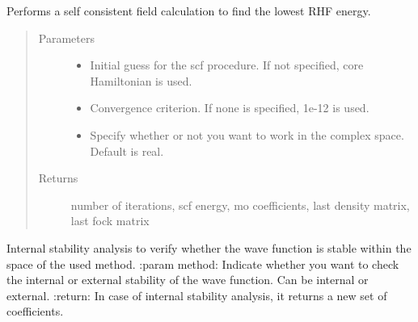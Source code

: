 \documentclass[letterpaper,10pt,english]{sphinxmanual}
\begin{document}
\begin{fulllineitems}

\begin{fulllineitems}
\label{\detokenize{RHF:hf.HartreeFock.RHF.MF.scf}}
Performs a self consistent field calculation to find the lowest RHF energy.
\begin{quote}\begin{description}
\item[{Parameters}] \leavevmode\begin{itemize}
\item {} 
 \textendash{} Initial guess for the scf procedure. If not specified, core Hamiltonian is used.

\item {} 
 \textendash{} Convergence criterion. If none is specified, 1e-12 is used.

\item {} 
 \textendash{} Specify whether or not you want to work in the complex space. Default is real.

\end{itemize}

\item[{Returns}] \leavevmode
number of iterations, scf energy, mo coefficients, last density matrix, last fock matrix

\end{description}\end{quote}

\end{fulllineitems}


\begin{fulllineitems}
\label{\detokenize{RHF:hf.HartreeFock.RHF.MF.stability_analysis}}
Internal stability analysis to verify whether the wave function is stable within the space of the used method.
:param method: Indicate whether you want to check the internal or external stability of the wave function. Can
be internal or external.
:return: In case of internal stability analysis, it returns a new set of coefficients.

\end{fulllineitems}


\end{fulllineitems}
\end{document}
